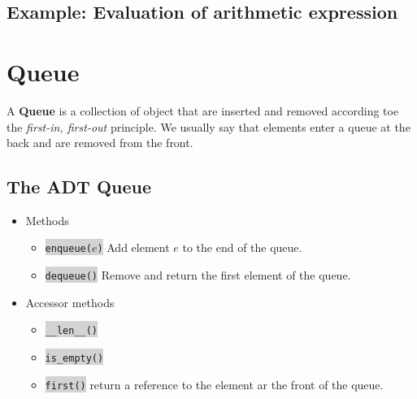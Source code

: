 \documentclass[10pt]{article}
\newcommand{\code}[1]{{\small\colorbox{LightGray}{\texttt{#1}}}}
\begin{document}
\subsection{Example: Evaluation of arithmetic expression}

\section{Queue}
A \textbf{Queue} is a collection of object that are inserted and removed according toe the \textit{first-in, first-out} principle. We usually say that elements enter a queue at the back and are removed from the front. 

\subsection{The ADT Queue}
\begin{itemize}
	\item Methods
	\begin{itemize}
		\item[] \code{enqueue($e$)} Add element $e$ to the end of the queue.
		\item[] \code{dequeue()} Remove and return the first element of the queue.
	\end{itemize}
	\item Accessor methods
	\begin{itemize}
		\item[] \code{\_\_len\_\_()} 
		\item[] \code{is\_empty()}
		\item[] \code{first()} return a reference to the element ar the front of the queue.
	\end{itemize}		
\end{itemize}
\end{document}
